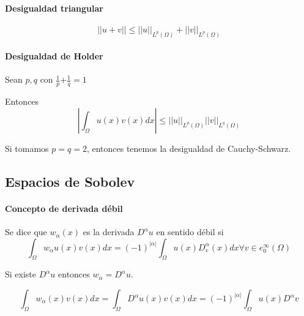 \paragraph{Desigualdad triangular}
$$||u+v||\le ||u||_{L^p(\Omega)}+||v||_{L^p(\Omega)}$$

\paragraph{Desigualdad de Holder}
Sean $p,q$ con $\frac{1}{p}$+$\frac{1}{q} = 1$

Entonces
$$|\int_{\Omega}u(x)v(x)dx|\le||u||_{L^p(\Omega)}||v||_{L^q(\Omega)}$$

Si tomamos $p=q=2$, entonces tenemos la desigualdad de Cauchy-Schwarz.

\subsection{Espacios de Sobolev}
\paragraph{Concepto de derivada débil}
Se dice que $w_\alpha(x)$ es la derivada $D^\alpha u$ en sentido débil si
$$\int_{\Omega}w_\alpha u(x) v(x)dx = (-1)^{|\alpha|}\int_{\Omega}u(x)D_v^\alpha (x) dx 
\forall v\in e_0^\infty(\Omega)$$

Si existe $D^\alpha u$ entonces $w_\alpha = D^\alpha u$.

$$\int_\Omega w_\alpha (x)v(x) dx = \int_{\Omega}D^\alpha u(x) v(x)dx = (-1)^|\alpha|\int_{\Omega}u(x)D^\alpha v$$

